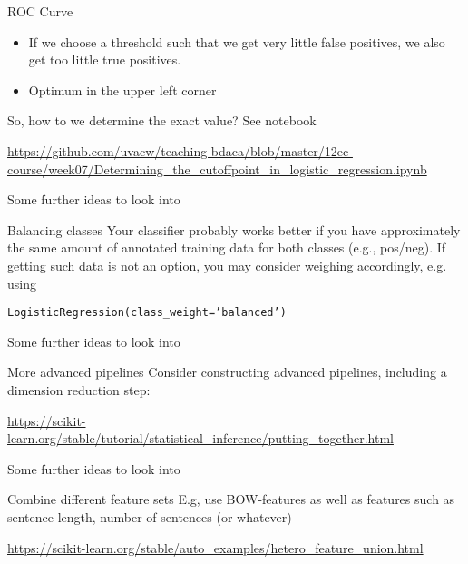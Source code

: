 \begin{frame}{ROC Curve}
\begin{itemize}
	\item If we choose a threshold such that we get very little false positives, we also get too little true positives.
	\item Optimum in the upper left corner
\end{itemize}

\end{frame}


\begin{frame}{So, how to we determine the exact value? }
See notebook

\url{https://github.com/uvacw/teaching-bdaca/blob/master/12ec-course/week07/Determining_the_cutoffpoint_in_logistic_regression.ipynb}
\end{frame}









\begin{frame}{Some further ideas to look into}

\begin{block}{Balancing classes}
Your classifier probably works better if you have approximately the same amount of annotated training data for both classes (e.g., pos/neg). If getting such data is not an option, you may consider weighing accordingly, e.g. using

\texttt{LogisticRegression(class\_weight='balanced')}
\end{block}

\end{frame}

\begin{frame}{Some further ideas to look into}

\begin{block}{More advanced pipelines}
	Consider constructing advanced pipelines, including a dimension reduction step: 
	
	
	\url{https://scikit-learn.org/stable/tutorial/statistical\_inference/putting\_together.html}
\end{block}

\end{frame}



\begin{frame}{Some further ideas to look into}
\begin{block}{Combine different feature sets}
  E.g, use BOW-features as well as features such as sentence length, number of sentences (or whatever)
  
	\url{
		https://scikit-learn.org/stable/auto\_examples/hetero\_feature\_union.html}
\end{block}



\end{frame}

